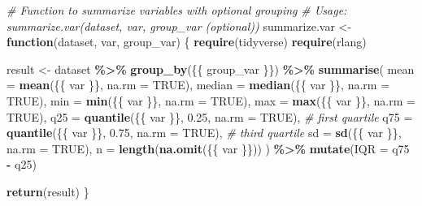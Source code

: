 \documentclass[
]{article}
\newenvironment{Shaded}{\begin{snugshade}}{\end{snugshade}}
\newcommand{\AttributeTok}[1]{\textcolor[rgb]{0.13,0.29,0.53}{#1}}
\newcommand{\CommentTok}[1]{\textcolor[rgb]{0.56,0.35,0.01}{\textit{#1}}}
\newcommand{\ConstantTok}[1]{\textcolor[rgb]{0.56,0.35,0.01}{#1}}
\newcommand{\ControlFlowTok}[1]{\textcolor[rgb]{0.13,0.29,0.53}{\textbf{#1}}}
\newcommand{\FloatTok}[1]{\textcolor[rgb]{0.00,0.00,0.81}{#1}}
\newcommand{\FunctionTok}[1]{\textcolor[rgb]{0.13,0.29,0.53}{\textbf{#1}}}
\newcommand{\NormalTok}[1]{#1}
\newcommand{\OtherTok}[1]{\textcolor[rgb]{0.56,0.35,0.01}{#1}}
\newcommand{\SpecialCharTok}[1]{\textcolor[rgb]{0.81,0.36,0.00}{\textbf{#1}}}
\begin{document}
\begin{Shaded}
\begin{Highlighting}[]
\CommentTok{\# Function to summarize variables with optional grouping}
\CommentTok{\# Usage: summarize.var(dataset, var, group\_var (optional))}
\NormalTok{summarize.var }\OtherTok{\textless{}{-}} \ControlFlowTok{function}\NormalTok{(dataset, var, group\_var) \{}
  \FunctionTok{require}\NormalTok{(tidyverse)}
  \FunctionTok{require}\NormalTok{(rlang)}

\NormalTok{  result }\OtherTok{\textless{}{-}}\NormalTok{ dataset }\SpecialCharTok{\%\textgreater{}\%}
    \FunctionTok{group\_by}\NormalTok{(\{\{ group\_var \}\}) }\SpecialCharTok{\%\textgreater{}\%}
    \FunctionTok{summarise}\NormalTok{(}
      \AttributeTok{mean =} \FunctionTok{mean}\NormalTok{(\{\{ var \}\}, }\AttributeTok{na.rm =} \ConstantTok{TRUE}\NormalTok{),}
      \AttributeTok{median =} \FunctionTok{median}\NormalTok{(\{\{ var \}\}, }\AttributeTok{na.rm =} \ConstantTok{TRUE}\NormalTok{),}
      \AttributeTok{min =} \FunctionTok{min}\NormalTok{(\{\{ var \}\}, }\AttributeTok{na.rm =} \ConstantTok{TRUE}\NormalTok{),}
      \AttributeTok{max =} \FunctionTok{max}\NormalTok{(\{\{ var \}\}, }\AttributeTok{na.rm =} \ConstantTok{TRUE}\NormalTok{),}
      \AttributeTok{q25 =} \FunctionTok{quantile}\NormalTok{(\{\{ var \}\}, }\FloatTok{0.25}\NormalTok{, }\AttributeTok{na.rm =} \ConstantTok{TRUE}\NormalTok{), }\CommentTok{\# first quartile}
      \AttributeTok{q75 =} \FunctionTok{quantile}\NormalTok{(\{\{ var \}\}, }\FloatTok{0.75}\NormalTok{, }\AttributeTok{na.rm =} \ConstantTok{TRUE}\NormalTok{), }\CommentTok{\# third quartile}
      \AttributeTok{sd =} \FunctionTok{sd}\NormalTok{(\{\{ var \}\}, }\AttributeTok{na.rm =} \ConstantTok{TRUE}\NormalTok{),}
      \AttributeTok{n =} \FunctionTok{length}\NormalTok{(}\FunctionTok{na.omit}\NormalTok{(\{\{ var \}\}))}
\NormalTok{    ) }\SpecialCharTok{\%\textgreater{}\%}
    \FunctionTok{mutate}\NormalTok{(}\AttributeTok{IQR =}\NormalTok{ q75 }\SpecialCharTok{{-}}\NormalTok{ q25)}

  \FunctionTok{return}\NormalTok{(result)}
\NormalTok{\}}
\end{Highlighting}
\end{Shaded}
\end{document}
